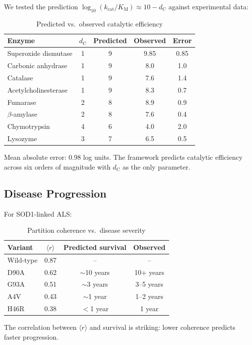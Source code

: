 \documentclass[twocolumn,10pt,a4paper]{article}
\theoremstyle{definition}
\theoremstyle{remark}
\newcommand{\Order}{\langle r \rangle}
\newcommand{\kcat}{k_{\mathrm{cat}}}
\newcommand{\Km}{K_{\mathrm{M}}}
\newcommand{\dC}{d_{\mathrm{C}}}
\begin{document}
We tested the prediction $\log_{10}(\kcat/\Km) \approx 10 - \dC$ against experimental data:

\begin{table}[h]
\centering
\caption{Predicted vs.\ observed catalytic efficiency}
\label{tab:validation_enzyme}
\begin{tabular}{lcccc}
\toprule
Enzyme & $\dC$ & Predicted & Observed & Error \\
\midrule
Superoxide dismutase & 1 & 9 & 9.85 & 0.85 \\
Carbonic anhydrase & 1 & 9 & 8.0 & 1.0 \\
Catalase & 1 & 9 & 7.6 & 1.4 \\
Acetylcholinesterase & 1 & 9 & 8.3 & 0.7 \\
Fumarase & 2 & 8 & 8.9 & 0.9 \\
$\beta$-amylase & 2 & 8 & 7.6 & 0.4 \\
Chymotrypsin & 4 & 6 & 4.0 & 2.0 \\
Lysozyme & 3 & 7 & 6.5 & 0.5 \\
\bottomrule
\end{tabular}
\end{table}

Mean absolute error: 0.98 log units. The framework predicts catalytic efficiency across six orders of magnitude with $\dC$ as the only parameter.

\subsection{Disease Progression}

For SOD1-linked ALS:

\begin{table}[h]
\centering
\caption{Partition coherence vs.\ disease severity}
\label{tab:validation_als}
\begin{tabular}{lccc}
\toprule
Variant & $\Order$ & Predicted survival & Observed \\
\midrule
Wild-type & 0.87 & -- & -- \\
D90A & 0.62 & $\sim$10 years & 10+ years \\
G93A & 0.51 & $\sim$3 years & 3--5 years \\
A4V & 0.43 & $\sim$1 year & 1--2 years \\
H46R & 0.38 & $<$1 year & 1 year \\
\bottomrule
\end{tabular}
\end{table}

The correlation between $\Order$ and survival is striking: lower coherence predicts faster progression.
\end{document}
